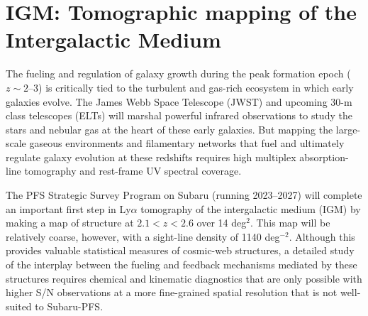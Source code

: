 \documentclass[11pt,a4paper,twoside,onecolumn,openany,final,oldfontcommands]{memoir}
\begin{document}

  


\section{IGM: Tomographic mapping of the Intergalactic Medium}

The fueling and regulation of galaxy growth during the peak formation epoch ($z \sim2$--3) is critically tied to the turbulent and gas-rich ecosystem in which early galaxies evolve. The James Webb Space Telescope (JWST) and upcoming 30-m class telescopes (ELTs) will marshal powerful infrared observations to study the stars and nebular gas at the heart of these early galaxies. But mapping the large-scale gaseous environments and filamentary networks that fuel and ultimately regulate galaxy evolution at these redshifts requires high multiplex absorption-line tomography and rest-frame UV spectral coverage.


The PFS Strategic Survey Program on Subaru (running 2023--2027) \citep{Nagamine:2020_tomography} will complete an important first step in Ly$\alpha$ tomography of the intergalactic medium (IGM) by making a map of structure at $2.1 < z < 2.6$ over 14 deg$^2$.  This map will be relatively coarse, however, with a sight-line density of 1140 deg$^{-2}$.  Although this provides valuable statistical measures of cosmic-web structures, a detailed study of the interplay between the fueling and feedback mechanisms mediated by these structures requires chemical and kinematic diagnostics that are only possible with higher S/N observations at a more fine-grained spatial resolution that is not well-suited to Subaru-PFS.
\end{document}
